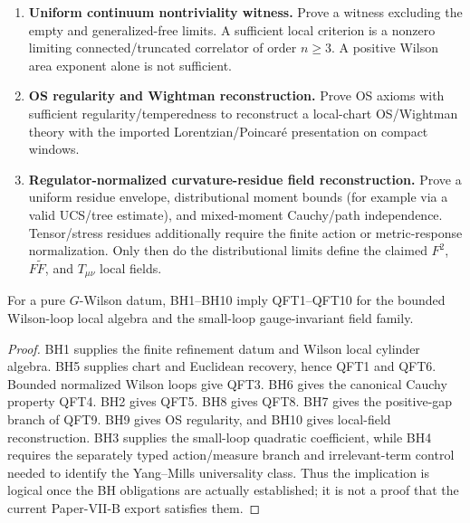 \documentclass[12pt,a4paper]{article}
\begin{document}
\begin{definition}
\begin{enumerate}[label=\textnormal{(BH\arabic*)}, leftmargin=3.1em]
\[
\inf_L(E_{1,L,G}-E_{0,L,G})\ge\Delta_{\ast,G}>0
\]
and show that it survives OS reconstruction.
\item \textbf{Uniform continuum nontriviality witness.}  Prove a witness excluding the empty and generalized-free limits.  A sufficient local criterion is a nonzero limiting connected/truncated correlator of order \(n\ge3\).  A positive Wilson area exponent alone is not sufficient.
\item \textbf{OS regularity and Wightman reconstruction.}  Prove OS axioms with sufficient regularity/temperedness to reconstruct a local-chart OS/Wightman theory with the imported Lorentzian/Poincar\'e presentation on compact windows.
\item \textbf{Regulator-normalized curvature-residue field reconstruction.}  Prove a uniform residue envelope, distributional moment bounds (for example via a valid UCS/tree estimate), and mixed-moment Cauchy/path independence.  Tensor/stress residues additionally require the finite action or metric-response normalization.  Only then do the distributional limits define the claimed \(F^2\), \(F\widetilde F\), and \(T_{\mu\nu}\) local fields.
\end{enumerate}
\end{definition}

\begin{proposition}
\label{p12:prop:bh-implies-qft}
For a pure \(G\)-Wilson datum, BH1--BH10 imply QFT1--QFT10 for the bounded Wilson-loop local algebra and the small-loop gauge-invariant field family.
\end{proposition}
\begin{proof}
BH1 supplies the finite refinement datum and Wilson local cylinder algebra.  BH5 supplies chart and Euclidean recovery, hence QFT1 and QFT6.  Bounded normalized Wilson loops give QFT3.  BH6 gives the canonical Cauchy property QFT4.  BH2 gives QFT5.  BH8 gives QFT8.  BH7 gives the positive-gap branch of QFT9.  BH9 gives OS regularity, and BH10 gives local-field reconstruction.  BH3 supplies the small-loop quadratic coefficient, while BH4 requires the separately typed action/measure branch and irrelevant-term control needed to identify the Yang--Mills universality class.  Thus the implication is logical once the BH obligations are actually established; it is not a proof that the current Paper-VII-B export satisfies them.
\end{proof}


\end{document}
